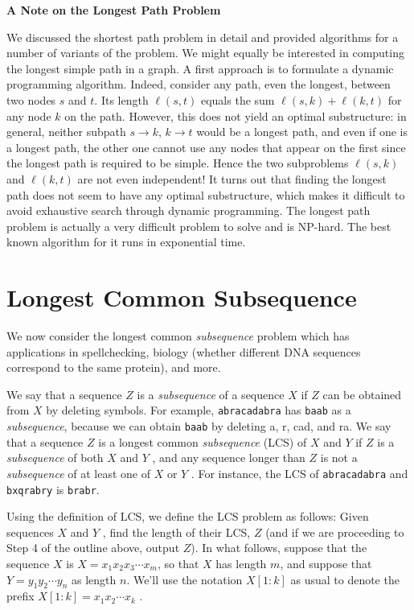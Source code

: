 \documentclass [12pt]{article}
\theoremstyle{definition}
\begin{document}
\textbf{A Note on the Longest Path Problem}

We discussed the shortest path problem in detail and provided algorithms for a number of variants of the problem. We might equally be interested in computing the longest simple path in a graph. A first approach is to formulate a dynamic programming algorithm. Indeed, consider any path, even the longest, between two nodes $s$ and $t$. Its length $\ell(s, t)$ equals the sum $\ell(s, k) + \ell(k, t)$ for any node $k$ on the path. However, this does not yield an optimal substructure: in general, neither subpath $s \to k$, $k \to t$ would be a longest path, and even if one is a longest path, the other one cannot use any nodes that appear on the first since the longest path is required to be simple. Hence the two subproblems $\ell(s, k)$ and $\ell(k, t)$ are not even independent! It turns out that finding the longest path does not seem to have any optimal substructure, which makes it difficult to avoid exhaustive search through dynamic programming. The longest path problem is actually a very difficult problem to solve and is NP-hard. The best known algorithm for it runs in exponential time.

\section{Longest Common Subsequence}
We now consider the longest common \textit{subsequence} problem which has applications in spellchecking, biology (whether different DNA sequences correspond to the same protein), and more. 

We say that a sequence $Z$ is a \textit{subsequence} of a sequence $X$ if $Z$ can be obtained from $X$ by deleting symbols. For example, \texttt{abracadabra} has \texttt{baab} as a \textit{subsequence}, because we can obtain \texttt{baab} by deleting a, r, cad, and ra. We say that a sequence $Z$ is a longest common \textit{subsequence} (LCS) of $X$ and $Y$ if $Z$ is a \textit{subsequence} of both $X$ and $Y$ , and any sequence longer than $Z$ is not a \textit{subsequence} of at least one of $X$ or $Y$ . For instance, the LCS of \texttt{abracadabra} and \texttt{bxqrabry} is \texttt{brabr}. 

Using the definition of LCS, we define the LCS problem as follows: Given sequences $X$ and $Y$ , find the length of their LCS, $Z$ (and if we are proceeding to Step 4 of the outline above, output $Z$). In what follows, suppose that the sequence $X$ is $X = x_1x_2x_3 \cdots x_m$, so that $X$ has length $m$, and suppose that $Y = y_1y_2 \cdots y_n$ as length $n$. We'll use the notation $X[1 : k]$ as usual to denote the prefix $X[1 : k] = x_1x_2 \cdots x_k$ .
\end{document}
